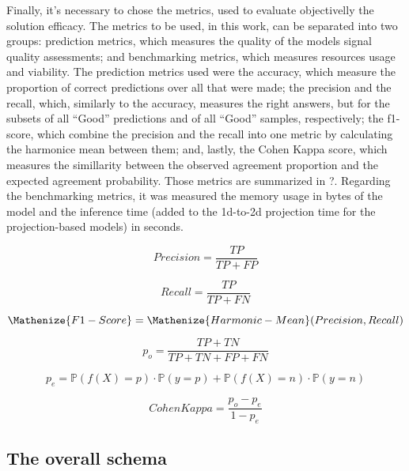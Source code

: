 Finally, it's necessary to chose the metrics, used to evaluate objectivelly the solution efficacy. The metrics to be used, in this work, can be separated into two groups: prediction metrics, which measures the quality of the models signal quality assessments; and benchmarking metrics, which measures resources usage and viability. The prediction metrics used were the accuracy, which measure the proportion of correct predictions over all that were made; the precision and the recall, which, similarly to the accuracy, measures the right answers, but for the subsets of all ``Good'' predictions and of all ``Good'' samples, respectively; the f1-score, which combine the precision and the recall into one metric by calculating the harmonice mean between them; and, lastly, the Cohen Kappa score, which measures the simillarity between the observed agreement proportion and the expected agreement probability. Those metrics are summarized in ?. Regarding the benchmarking metrics, it was measured the memory usage in bytes of the model and the inference time (added to the 1d-to-2d projection time for the projection-based models) in seconds.

\begin{equation} \label{eq:Precision}
Precision = \frac{TP}{TP+FP}
\end{equation}


\begin{equation} \label{eq:Recall}
Recall = \frac{TP}{TP+FN}
\end{equation}

\begin{equation} \label{eq:F1-Score}
\Mathenize{F1-Score}  = \Mathenize{Harmonic-Mean}(Precision,Recall) 
\end{equation}


\begin{equation} 
p_o = \frac{TP+TN}{TP+TN+FP+FN}
\end{equation}

\begin{equation}
p_e  = \mathbb{P}(f(X)=p) \cdot \mathbb{P}(y=p) + \mathbb{P}(f(X)=n) \cdot \mathbb{P}(y=n)
\end{equation}

\begin{equation} \label{eq:Cohen Kappa}
Cohen Kappa  = \frac{p_o - p_e}{1 - p_e} 
\end{equation}

\subsection{The overall schema}

